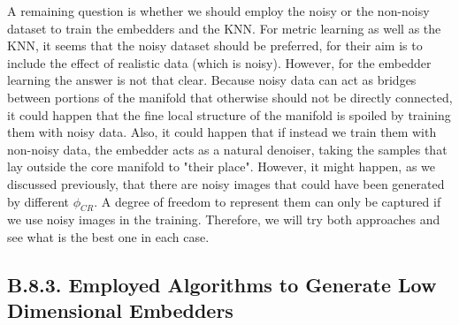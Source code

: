 \documentclass[11pt, a4paper, twoside]{article} %
\begin{document}
 A remaining question is whether we should employ the noisy or the non-noisy dataset to train the embedders and the KNN. For metric learning as well as the KNN, it seems that the noisy dataset should be preferred, for their aim is to include the effect of realistic data (which is noisy). However, for the embedder learning the answer is not that clear. Because noisy data can act as bridges between portions of the manifold that otherwise should not be directly connected, it could happen that the fine local structure of the manifold is spoiled by training them with noisy data. Also, it could happen that if instead we train them with non-noisy data, the embedder acts as a natural denoiser, taking the samples that lay outside the core manifold to "their place". However, it might happen, as we discussed previously, that there are noisy images that could have been generated by different $\phi_{CR}$. A degree of freedom to represent them can only be captured if we use noisy images in the training. Therefore, we will try both approaches and see what is the best one in each case. 
\vspace*{-0.6cm}


\subsection*{B.8.3. Employed Algorithms to Generate Low Dimensional Embedders\vspace{-0.15cm}}
\end{document}
